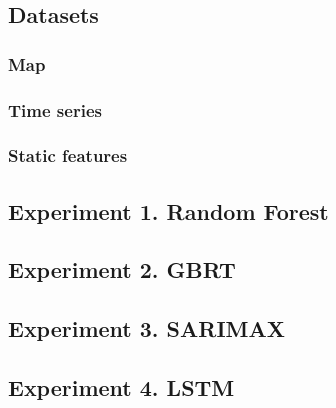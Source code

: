 \documentclass{article}
\begin{document}
\subsection*{Datasets}

\subsubsection*{Map}

\subsubsection*{Time series}

\subsubsection*{Static features}

\subsection{Experiment 1. Random Forest}
\label{experiment:random-forest}

\subsection{Experiment 2. GBRT}
\label{experiment:GBRT}

\subsection{Experiment 3. SARIMAX}
\label{experiment:SARIMAX}


\subsection{Experiment 4. LSTM}
\label{experiment:LSTM}

\end{document}
